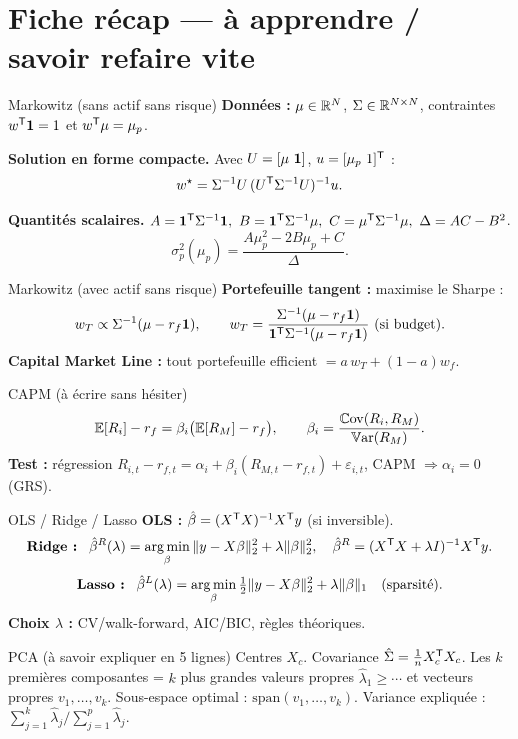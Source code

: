 \section{Fiche récap --- à apprendre / savoir refaire vite}

\begin{recapbox}{Markowitz (sans actif sans risque)}
\textbf{Données :} $\mu\in\mathbb{R}^N$, $\Sigma\in\mathbb{R}^{N\times N}$, contraintes $w^{\mathsf{T}}\mathbf{1}=1$ et $w^{\mathsf{T}}\mu=\mu_p$.

\medskip
\textbf{Solution en forme compacte.} Avec $U=[\mu\ \mathbf{1}]$, $u=[\mu_p\ 1]^{\mathsf{T}}$ :
\[
w^\star=\Sigma^{-1}U\,(U^{\mathsf{T}}\Sigma^{-1}U)^{-1}u.
\]

\medskip
\textbf{Quantités scalaires.} $A=\1^\trans\Sigma^{-1}\1,\ B=\1^\trans\Sigma^{-1}\mu,\ C=\mu^\trans\Sigma^{-1}\mu,\ \Delta=AC-B^2$.
\[
\sigma_p^2(\mu_p)=\frac{A\mu_p^2-2B\mu_p+C}{\Delta}.
\]
\end{recapbox}

\begin{recapbox}{Markowitz (avec actif sans risque)}
\textbf{Portefeuille tangent :} maximise le Sharpe :
\[
w_T \propto \Sigma^{-1}(\mu-r_f\1),\qquad
w_T = \frac{\Sigma^{-1}(\mu-r_f\1)}{\1^\trans\Sigma^{-1}(\mu-r_f\1)}\ \text{(si budget)}.
\]
\textbf{Capital Market Line :} tout portefeuille efficient $= a\,w_T+(1-a)w_f$.
\end{recapbox}

\begin{recapbox}{CAPM (à écrire sans hésiter)}
\[
\mathbb{E}[R_i]-r_f=\beta_i\big(\mathbb{E}[R_M]-r_f\big),\qquad
\beta_i=\frac{\mathbb{C}\mathrm{ov}(R_i,R_M)}{\mathbb{V}\mathrm{ar}(R_M)}.
\]
\textbf{Test :} régression $R_{i,t}-r_{f,t}=\alpha_i+\beta_i(R_{M,t}-r_{f,t})+\varepsilon_{i,t}$, CAPM $\Rightarrow \alpha_i=0$ (GRS).
\end{recapbox}

\begin{recapbox}{OLS / Ridge / Lasso}
\textbf{OLS :} $\hat\beta=(X^{\mathsf{T}} X)^{-1}X^{\mathsf{T}} y$ (si inversible).
\[
\textbf{Ridge : }\ \hat\beta^{R}(\lambda)=\argmin_\beta \|y-X\beta\|_2^2+\lambda\|\beta\|_2^2
,\quad
\hat\beta^{R}=(X^\trans X+\lambda I)^{-1}X^\trans y.
\]
\[
\textbf{Lasso : }\ \hat\beta^{L}(\lambda)=\argmin_\beta \tfrac12\|y-X\beta\|_2^2+\lambda\|\beta\|_1
\quad(\text{sparsité}).
\]
\textbf{Choix $\lambda$ :} CV/walk-forward, AIC/BIC, règles théoriques.
\end{recapbox}

\begin{recapbox}{PCA (à savoir expliquer en 5 lignes)}
Centres $X_c$. Covariance $\hat\Sigma=\frac1n X_c^{\mathsf{T}} X_c$.
Les $k$ premières composantes = $k$ plus grandes valeurs propres $\hat\lambda_1\ge\cdots$ et vecteurs propres $v_1,\dots,v_k$.
Sous-espace optimal : $\mathrm{span}(v_1,\dots,v_k)$.
Variance expliquée : $\sum_{j=1}^k \hat\lambda_j / \sum_{j=1}^p \hat\lambda_j$.
\end{recapbox}

